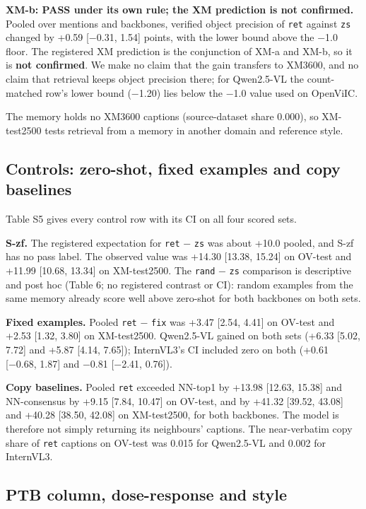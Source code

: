 \documentclass[manuscript,screen]{acmart}
\begin{document}
\textbf{XM-b: PASS under its own rule; the XM prediction is not confirmed.} Pooled over mentions and
backbones, verified object precision of \texttt{ret} against \texttt{zs} changed by +0.59 {[}−0.31,
1.54{]} points, with the lower bound above the −1.0 floor. The registered XM prediction is the
conjunction of XM-a and XM-b, so it is \textbf{not confirmed}. We make no claim that the gain
transfers to XM3600, and no claim that retrieval keeps object precision there; for Qwen2.5-VL the
count-matched row's lower bound (−1.20) lies below the −1.0 value used on OpenViIC.

The memory holds no XM3600 captions (source-dataset share 0.000), so XM-test2500 tests retrieval
from a memory in another domain and reference style.

\subsection{Controls: zero-shot, fixed examples and copy
baselines}\label{controls-zero-shot-fixed-examples-and-copy-baselines}

Table S5 gives every control row with its CI on all four scored sets.

\textbf{S-zf.} The registered expectation for \texttt{ret} − \texttt{zs} was about +10.0 pooled, and
S-zf has no pass label. The observed value was +14.30 {[}13.38, 15.24{]} on OV-test and +11.99
{[}10.68, 13.34{]} on XM-test2500. The \texttt{rand} − \texttt{zs} comparison is descriptive and
post hoc (Table 6; no registered contrast or CI): random examples from the same memory already score
well above zero-shot for both backbones on both sets.

\textbf{Fixed examples.} Pooled \texttt{ret} − \texttt{fix} was +3.47 {[}2.54, 4.41{]} on OV-test
and +2.53 {[}1.32, 3.80{]} on XM-test2500. Qwen2.5-VL gained on both sets (+6.33 {[}5.02, 7.72{]}
and +5.87 {[}4.14, 7.65{]}); InternVL3's CI included zero on both (+0.61 {[}−0.68, 1.87{]} and −0.81
{[}−2.41, 0.76{]}).

\textbf{Copy baselines.} Pooled \texttt{ret} exceeded NN-top1 by +13.98 {[}12.63, 15.38{]} and
NN-consensus by +9.15 {[}7.84, 10.47{]} on OV-test, and by +41.32 {[}39.52, 43.08{]} and +40.28
{[}38.50, 42.08{]} on XM-test2500, for both backbones. The model is therefore not simply returning
its neighbours' captions. The near-verbatim copy share of \texttt{ret} captions on OV-test was 0.015
for Qwen2.5-VL and 0.002 for InternVL3.

\subsection{PTB column, dose-response and style}\label{ptb-column-dose-response-and-style}
\end{document}
